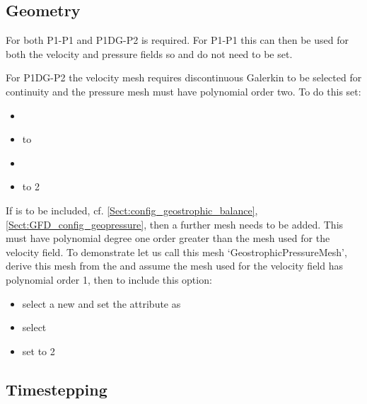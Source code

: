 \subsection{Geometry}
\label{sect:GFD_config_geometry}

For both P1-P1 and P1DG-P2  is required. For P1-P1 this can then be used for both the velocity and pressure fields so  and  do not need to be set.

For P1DG-P2 the velocity mesh requires discontinuous Galerkin to be selected for continuity and the pressure mesh must have polynomial order two. To do this set:
\begin{itemize}
\item {}
\item {} to 
\item {}
\item {} to 2
\end{itemize}

If  is to be included, cf. \ref{Sect:config_geostrophic_balance}, \ref{Sect:GFD_config_geopressure}, then a further mesh needs to be added. This must have polynomial degree one order greater than the mesh used for the velocity field. To demonstrate let us call this mesh `GeostrophicPressureMesh', derive this mesh from the  and assume the mesh used for the velocity field has polynomial order 1, then to include this option:
\begin{itemize}
\item select a new  and set the  attribute as 
\item select 
\item set  to 2
\end{itemize}

\subsection{Timestepping}

